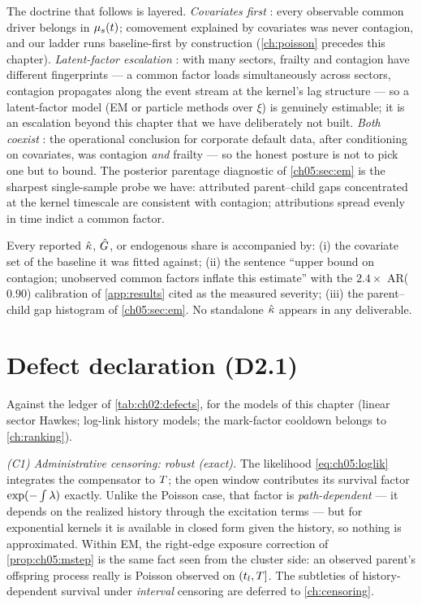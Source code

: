 The doctrine that follows is layered. \emph{Covariates first}
\citep{duffie2007}: every observable common driver belongs in
$\mu_s(t)$; comovement explained by covariates was never contagion, and
our ladder runs baseline-first by construction
(\cref{ch:poisson} precedes this chapter). \emph{Latent-factor
escalation} \citep{duffie2009}: with many sectors, frailty and contagion
have different fingerprints --- a common factor loads simultaneously
across sectors, contagion propagates along the event stream at the
kernel's lag structure --- so a latent-factor model (EM or particle
methods over $\xi$) is genuinely estimable; it is an escalation beyond
this chapter that we have deliberately not built. \emph{Both coexist}
\citep{azizpour2018}: the operational conclusion for corporate default
data, after conditioning on covariates, was contagion \emph{and} frailty
--- so the honest posture is not to pick one but to bound. The posterior
parentage diagnostic of \cref{ch05:sec:em} is the sharpest single-sample
probe we have: attributed parent--child gaps concentrated at the kernel
timescale are consistent with contagion; attributions spread evenly in
time indict a common factor.

\begin{protocol}\label{prot:ch05:upperbound}
Every reported $\hat{\kappa}$, $\hat{G}$, or endogenous share is
accompanied by: (i) the covariate set of the baseline it was fitted
against; (ii) the sentence ``upper bound on contagion; unobserved
common factors inflate this estimate'' with the $2.4\times$ AR($0.90$)
calibration of \cref{app:results} cited as the measured severity; (iii)
the parent--child gap histogram of \cref{ch05:sec:em}. No standalone
$\hat{\kappa}$ appears in any deliverable.
\end{protocol}

\section{Defect declaration (D2.1)}\label{ch05:sec:defects}

Against the ledger of \cref{tab:ch02:defects}, for the models of this
chapter (linear sector Hawkes; log-link history models; the mark-factor
cooldown belongs to \cref{ch:ranking}).

\emph{(C1) Administrative censoring: robust (exact).} The likelihood
\cref{eq:ch05:loglik} integrates the compensator to $T$; the open
window contributes its survival factor $\exp(-\int\lambda)$ exactly. Unlike
the Poisson case, that factor is \emph{path-dependent} --- it depends on
the realized history through the excitation terms --- but for exponential
kernels it is available in closed form given the history, so nothing is
approximated. Within EM, the right-edge exposure correction of
\cref{prop:ch05:mstep} is the same fact seen from the cluster side: an
observed parent's offspring process really is Poisson observed on
$(t_l,T]$. The subtleties of history-dependent survival under
\emph{interval} censoring are deferred to \cref{ch:censoring}.

